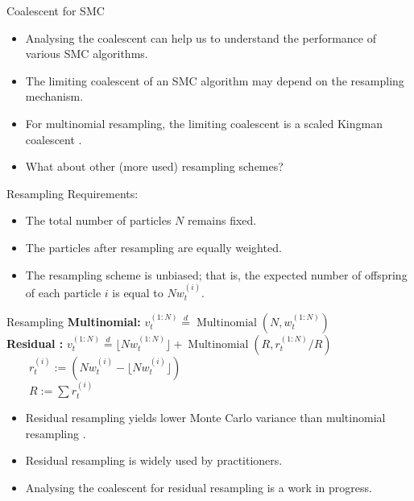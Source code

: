 \documentclass[aspectratio=169]{beamer}
\theoremstyle{definition}
\newcommand{\eqdist}{\overset{d}{=}}
\newcommand{\vt}[2][t]{v_{#1}^{(#2)}}
\newcommand{\wt}[2][t]{w_{#1}^{(#2)}}
\begin{document}
\begin{frame}{Coalescent for SMC}
\begin{itemize}
\item Analysing the coalescent can help us to understand the performance of various SMC algorithms.
\pause
\item The limiting coalescent of an SMC algorithm may depend on the resampling mechanism.
\pause
\item For multinomial resampling, the limiting coalescent is a scaled Kingman coalescent \cite{koskela2018}.
\pause
\item What about other (more used) resampling schemes?
\end{itemize}
\end{frame}

\begin{frame}{Resampling}
Requirements:\\[12pt]
\begin{itemize}
\item The total number of particles $N$ remains fixed. 
\item The particles after resampling are equally weighted. 
\item The resampling scheme is unbiased; that is, the expected number of offspring of each particle $i$ is equal to $N\wt{i}$.
\end{itemize}
\end{frame}

\begin{frame}{Resampling}
\textbf{Multinomial:}
$\vt{1:N} \eqdist \operatorname{Multinomial}(N, \wt{1:N})$\\[12pt]
\pause
\textbf{Residual \cite{liu1998}:}
$\vt{1:N} \eqdist \lfloor N \wt{1:N} \rfloor +  \operatorname{Multinomial}(R, r_t^{(1:N)}/R)$\\[7pt]
$\qquad r_t^{(i)} := (N \wt{i} - \lfloor N \wt{i}\rfloor)$\\[7pt]
$\qquad R:= \sum r_t^{(i)}$\\[12pt]
\pause
\begin{itemize}
\item Residual resampling yields lower Monte Carlo variance than multinomial resampling \cite{douc2005}.
\item Residual resampling is widely used by practitioners.
\item Analysing the coalescent for residual resampling is a work in progress.
\end{itemize}
\end{frame}
\end{document}
